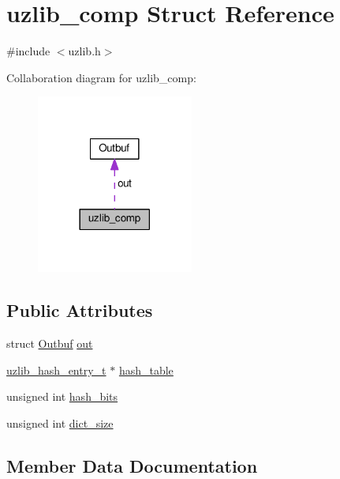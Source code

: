\hypertarget{structuzlib__comp}{}\section{uzlib\+\_\+comp Struct Reference}
\label{structuzlib__comp}


{\ttfamily \#include $<$uzlib.\+h$>$}



Collaboration diagram for uzlib\+\_\+comp\+:
\nopagebreak
\begin{figure}[H]
\begin{center}
\leavevmode
\includegraphics[width=146pt]{structuzlib__comp__coll__graph}
\end{center}
\end{figure}
\subsection*{Public Attributes}
\begin{DoxyCompactItemize}
\item 
struct \hyperlink{structOutbuf}{Outbuf} \hyperlink{structuzlib__comp_ac66a73f5d1846cb9a0b922c34b45a593}{out}
\item 
\hyperlink{uzlib_8h_af9caddd163536256592f41ef7ce89473}{uzlib\+\_\+hash\+\_\+entry\+\_\+t} $\ast$ \hyperlink{structuzlib__comp_aaac0b4d06083ea5666730aec37055bf1}{hash\+\_\+table}
\item 
unsigned int \hyperlink{structuzlib__comp_a08c6c7a785a938fc7e8cd20246a2e713}{hash\+\_\+bits}
\item 
unsigned int \hyperlink{structuzlib__comp_ae12f4aeed98de5a9ac28a17e80e94b25}{dict\+\_\+size}
\end{DoxyCompactItemize}


\subsection{Member Data Documentation}

